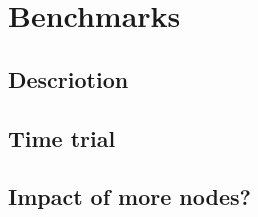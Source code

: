 \chapter{Benchmarks}\label{ch:benchmarks}

\section{Descriotion}

\section{Time trial}

\section{Impact of more nodes?}
